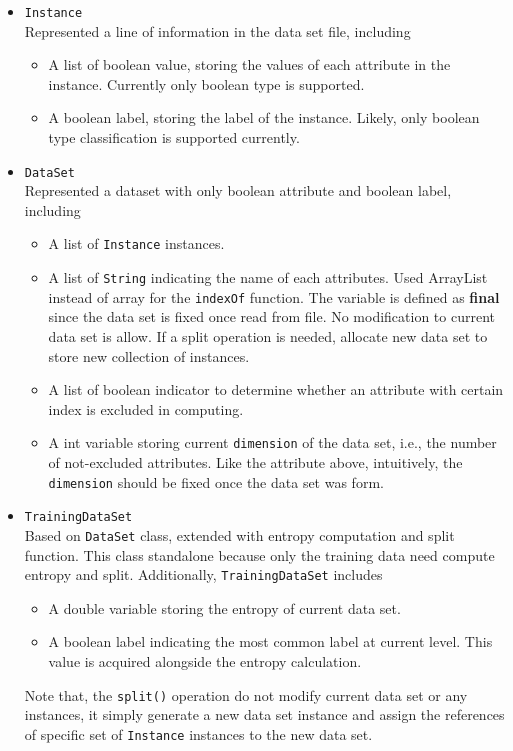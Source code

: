 \documentclass[12pt, letterpaper]{article}
\begin{document}
\begin{itemize}
    \item \texttt{Instance}\\
    Represented a line of information in the data set file, including
    \begin{itemize}
        \item A list of boolean value, storing the values of each attribute in the instance. Currently only boolean type is supported.
        \item A boolean label, storing the label of the instance. Likely, only boolean type classification is supported currently.
    \end{itemize}

    \item \texttt{DataSet}\\
    Represented a dataset with only boolean attribute and boolean label, including
    \begin{itemize}
        \item A list of \texttt{Instance} instances.
        \item A list of \texttt{String} indicating the name of each attributes. Used ArrayList instead of array for the \texttt{indexOf} function. The variable is defined as \textbf{final} since the data set is fixed once read from file. No modification to current data set is allow. If a split operation is needed, allocate new data set to store new collection of instances.
        \item A list of boolean indicator to determine whether an attribute with certain index is excluded in computing.
        \item A int variable storing current \texttt{dimension} of the data set, i.e., the number of not-excluded attributes. Like the attribute above, intuitively, the \texttt{dimension} should be fixed once the data set was form.
    \end{itemize}

    \item \texttt{TrainingDataSet}\\
    Based on \texttt{DataSet} class, extended with entropy computation and split function. This class standalone because only the training data need compute entropy and split. Additionally, \texttt{TrainingDataSet} includes
    \begin{itemize}
        \item A double variable storing the entropy of current data set.
        \item A boolean label indicating the most common label at current level. This value is acquired alongside the entropy  calculation.
    \end{itemize}
    Note that, the \texttt{split()} operation do not modify current data set or any instances, it simply generate a new data set instance and assign the references of specific set of \texttt{Instance} instances to the new data set.


\end{itemize}
\end{document}
